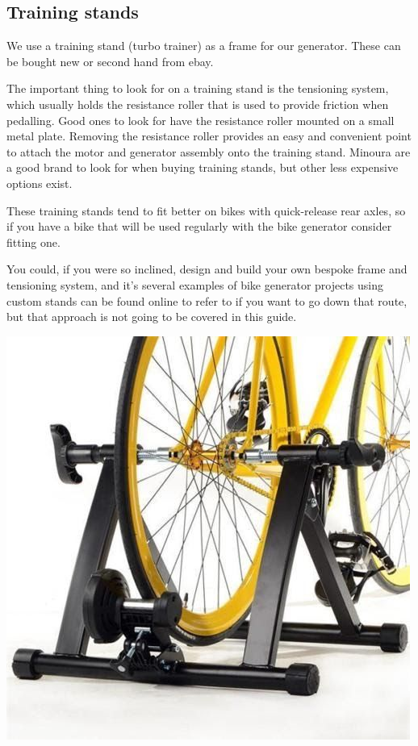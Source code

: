 \documentclass{article}
\theoremstyle{definition}
\theoremstyle{definition}
\theoremstyle{remark}
\begin{document}

  {\color{blue}\subsection{Training stands}} %
  \label{sub:training_stands}

    We use a training stand (turbo trainer) as a frame for our generator. These can be bought new or second hand from ebay.

    The important thing to look for on a training stand is the tensioning system, which usually holds the resistance roller that is used to provide friction when pedalling. Good ones to look for have the resistance roller mounted on a small metal plate. Removing the resistance roller provides an easy and convenient point to attach the motor and generator assembly onto the training stand. Minoura are a good brand to look for when buying training stands, but other less expensive options exist.

    These training stands tend to fit better on bikes with quick-release rear axles, so if you have a bike that will be used regularly with the bike generator consider fitting one. 

    You could, if you were so inclined, design and build your own bespoke frame and tensioning system, and it’s several examples of bike generator projects using custom stands can be found online to refer to if you want to go down that route, but that approach is not going to be covered in this guide.
  
    \begin{center}
      \includegraphics[width=0.25\paperwidth]{../Images/image_3_2_(training_stands).png}
    \end{center}
  
\end{document}
